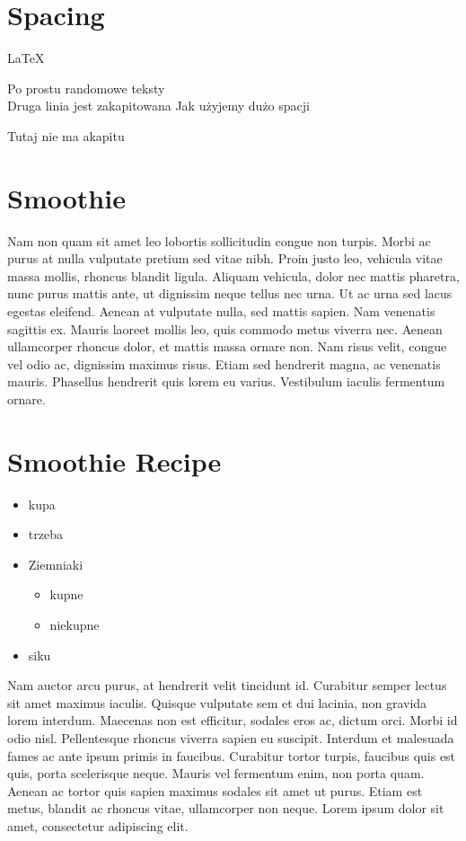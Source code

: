 \documentclass[a4paper,10pt]{book}
\begin{document}
\section*{Spacing}
\LaTeX\

Po prostu randomowe 
teksty\\

Druga linia jest zakapitowana Jak     użyjemy      dużo     spacji \\
\nolinebreak

Tutaj nie ma akapitu


\newpage

\section{Smoothie}

Nam non quam sit amet leo lobortis sollicitudin congue non turpis. Morbi ac purus at nulla vulputate pretium sed vitae nibh. Proin justo leo, vehicula vitae massa mollis, rhoncus blandit ligula. Aliquam vehicula, dolor nec mattis pharetra, nunc purus mattis ante, ut dignissim neque tellus nec urna. Ut ac urna sed lacus egestas eleifend. Aenean at vulputate nulla, sed mattis sapien. Nam venenatis sagittis ex. Mauris laoreet mollis leo, quis commodo metus viverra nec. Aenean ullamcorper rhoncus dolor, et mattis massa ornare non. Nam risus velit, congue vel odio ac, dignissim maximus risus. Etiam sed hendrerit magna, ac venenatis mauris. Phasellus hendrerit quis lorem eu varius. Vestibulum iaculis fermentum ornare. 

\section[Smoothie]{Smoothie Recipe}

\begin{itemize}
	\item kupa
	\item trzeba
	\item Ziemniaki
	\begin{itemize}
		\item kupne
		\item niekupne
	\end{itemize}
	\item siku
\end{itemize}

Nam auctor arcu purus, at hendrerit velit tincidunt id. Curabitur semper lectus sit amet maximus iaculis. Quisque vulputate sem et dui lacinia, non gravida lorem interdum. Maecenas non est efficitur, sodales eros ac, dictum orci. Morbi id odio nisl. Pellentesque rhoncus viverra sapien eu suscipit. Interdum et malesuada fames ac ante ipsum primis in faucibus. Curabitur tortor turpis, faucibus quis est quis, porta scelerisque neque. Mauris vel fermentum enim, non porta quam. Aenean ac tortor quis sapien maximus sodales sit amet ut purus. Etiam est metus, blandit ac rhoncus vitae, ullamcorper non neque. Lorem ipsum dolor sit amet, consectetur adipiscing elit. 
\end{document}
